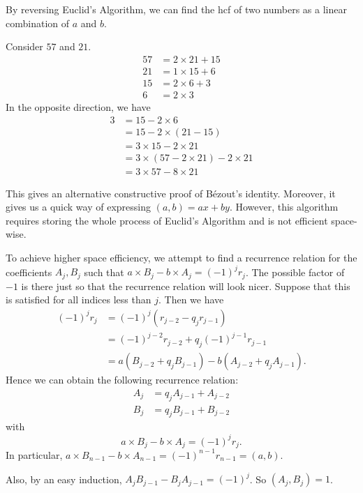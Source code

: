 \documentclass[a4paper]{article}
\begin{document}
By reversing Euclid's Algorithm, we can find the hcf of two numbers as a linear combination of $a$ and $b$.
\begin{eg}
  Consider $57$ and $21$.
  \begin{align*}
    57 &= 2\times 21 + 15\\
    21 &= 1\times 15 + 6\\
    15 &= 2\times 6 + 3\\
    6 &= 2\times 3
  \end{align*}
  In the opposite direction, we have
  \begin{align*}
    3 &= 15 - 2\times 6\\
    &= 15 - 2\times (21 - 15)\\
    &= 3\times 15 - 2\times 21\\
    &= 3\times (57 - 2\times 21) - 2\times 21\\
    &= 3\times 57 - 8\times 21
  \end{align*}
\end{eg}

This gives an alternative constructive proof of B\'{e}zout's identity. Moreover, it gives us a quick way of expressing $(a, b) = ax + by$. However, this algorithm requires storing the whole process of Euclid's Algorithm and is not efficient space-wise.

To achieve higher space efficiency, we attempt to find a recurrence relation for the coefficients $A_j, B_j$ such that $a\times B_j - b \times A_j = (-1)^{j}r_j$. The possible factor of $-1$ is there just so that the recurrence relation will look nicer. Suppose that this is satisfied for all indices less than $j$. Then we have
\begin{align*}
  (-1)^jr_{j} &= (-1)^j(r_{j - 2} - q_jr_{j - 1})\\
  &= (-1)^{j - 2} r_{j - 2} + q_j (-1)^{j - 1} r_{j - 1}\\
  &= a (B_{j - 2} + q_j B_{j - 1}) - b (A_{j - 2} + q_j A_{j - 1}).
\end{align*}
Hence we can obtain the following recurrence relation:
\begin{align*}
  A_j &= q_jA_{j-1} + A_{j-2}\\
  B_j &= q_jB_{j-1} + B_{j-2}
\end{align*}
with
\[
  a\times B_j - b\times A_j = (-1)^{j}r_j.
\]
In particular, $a\times B_{n-1} - b\times A_{n-1} = (-1)^{n-1}r_{n - 1} = (a, b)$.

Also, by an easy induction, $A_jB_{j - 1} - B_jA_{j-1} = (-1)^j$. So $(A_j, B_j) = 1$.
\end{document}
